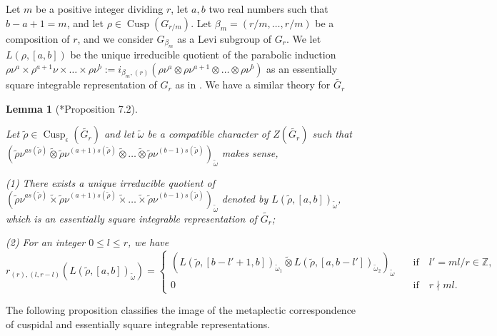 \documentclass{amsart}
\numberwithin{equation}{section}
\newtheorem{lemma}[theorem]{\bf{Lemma}}
\newcommand{\mrcusp}{\operatorname{Cusp}}
\newcommand{\mbz}{\mathbb{Z}}
\newcommand{\wt}[1]{\widetilde{#1}}
\begin{document}
	Let $m$ be a positive integer dividing $r$, let $a,b$ two real numbers such that $b-a+1=m$, and let $\rho\in\mrcusp(G_{r/m})$. Let $\beta_{m}=(r/m,\dots,r/m)$ be a composition of $r$, and we consider $G_{\beta_{m}}$ as a Levi subgroup of $G_{r}$. We let $L(\rho,[a,b])$ be the unique irreducible quotient of the parabolic induction $\rho\nu^{a}\times\rho^{a+1}\nu\times\dots\times\rho\nu^{b}:=i_{\beta_{m},(r)}(\rho\nu^{a}\otimes\rho\nu^{a+1}\otimes\dots\otimes\rho\nu^{b})$ as an essentially square integrable representation of $G_{r}$ as in \cite{zelevinsky1980induced}. We have a similar theory for $\wt{G_{r}}$
	
	\begin{lemma}[\cite{kaplan2022classification}*{Proposition 7.2}]\label{lemmaLabwtrho}
		
		Let $\wt{\rho}\in\mrcusp_{\epsilon}(\wt{G_{r}})$ and  let $\wt{\omega}$ be a compatible character of $Z(\wt{G_{r}})$ such that $(\wt{\rho}\nu^{as(\wt{\rho})}\wt{\otimes}\wt{\rho}\nu^{(a+1)s(\wt{\rho})}\wt{\otimes}\dots\wt{\otimes}\wt{\rho}\nu^{(b-1)s(\wt{\rho})})_{\wt{\omega}}$ makes sense,
		
		(1) There exists a unique irreducible quotient of $(\wt{\rho}\nu^{as(\wt{\rho})}\wt{\times}\wt{\rho}\nu^{(a+1)s(\wt{\rho})}\wt{\times}\dots\wt{\times}\wt{\rho}\nu^{(b-1)s(\wt{\rho})})_{\wt{\omega}}$
		denoted by $L(\wt{\rho},[a,b])_{\wt{\omega}}$, which is an essentially square integrable representation of $\wt{G_{r}}$;
		
		(2) For an integer $0\leq l\leq r$, we have
		$$
		r_{(r),(l,r-l)}(L(\wt{\rho},[a,b])_{\wt{\omega}})=\begin{cases} (L(\wt{\rho},[b-l'+1,b])_{\wt{\omega}_{1}}\wt{\otimes}L(\wt{\rho},[a,b-l'])_{\wt{\omega}_{2}})_{\wt{\omega}}\quad &\text{if}\quad l'=ml/r\in\mbz,   \\
			0\quad & \text{if}\quad r\nmid ml.
		\end{cases}
		$$ 
		
	\end{lemma} 
	
	The following proposition classifies the image of the metaplectic correspondence of cuspidal and essentially square integrable representations.
	
\end{document}
